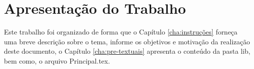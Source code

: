     \section{Apresentação do Trabalho}
        \label{sec:apresentacao-trabalho}
        Este trabalho foi organizado de forma que o Capítulo \ref{cha:instruções} forneça uma breve descrição sobre o tema, informe os objetivos e motivação da realização deste documento, o Capítulo \ref{cha:pre-textuais} apresenta o conteúdo da pasta lib, bem como, o arquivo Principal.tex.